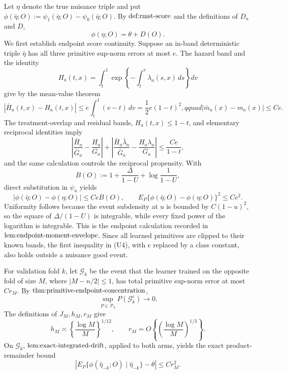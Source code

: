 Let \(\eta\) denote the true nuisance triple and put \(\phi(\bar\eta;O):=\psi_1(\bar\eta;O)-\psi_0(\bar\eta;O)\).  By \(\textnormal{def:rmst-score}\) and the definitions of \(D_a\) and \(D\),
\[
 \phi(\eta;O)=\theta+D(O).                                             \tag{U1}
\]
We first establish endpoint score continuity.  Suppose an in-band deterministic triple \(\bar\eta\) has all three primitive sup-norm errors at most \(e\).  The hazard band and the identity
\[
 H_a(t,x)=\int_t^1\exp\!\left\{-\int_t^v\lambda_a(s,x)\,ds\right\}dv
\]
give by the mean-value theorem
\[
 |\bar H_a(t,x)-H_a(t,x)|\le e\int_t^1(v-t)\,dv
 =\frac12e(1-t)^2,qquad |\bar m_a(x)-m_a(x)|\le Ce.                   \tag{U2}
\]
The treatment-overlap and residual bands, \(H_a(t,x)\le1-t\), and elementary reciprocal identities imply
\[
 \left|\frac{\bar H_a}{\bar G_a}-\frac{H_a}{G_a}\right|
 +\left|\frac{\bar H_a\bar\lambda_a}{\bar G_a}
       -\frac{H_a\lambda_a}{G_a}\right|
 \le\frac{Ce}{1-t},                                                    \tag{U3}
\]
and the same calculation controls the reciprocal propensity.  With
\[
 B(O):=1+\frac{\Delta}{1-U}+\log\frac1{1-U},
\]
direct substitution in \(\psi_a\) yields
\[
 |\phi(\bar\eta;O)-\phi(\eta;O)|\le CeB(O),
 \qquad E_P\{\phi(\bar\eta;O)-\phi(\eta;O)\}^2\le Ce^2.              \tag{U4}
\]
Uniformity follows because the event subdensity at \(u\) is bounded by \(C(1-u)^2\), so the square of \(\Delta/(1-U)\) is integrable, while every fixed power of the logarithm is integrable.  This is the endpoint calculation recorded in \(\textnormal{lem:endpoint-moment-envelope}\).  Since all learned primitives are clipped to their known bands, the first inequality in (U4), with \(e\) replaced by a class constant, also holds outside a nuisance good event.

For validation fold \(k\), let \(\mathcal G_k\) be the event that the learner trained on the opposite fold of size \(M\), where \(|M-n/2|\le1\), has total primitive sup-norm error at most \(Cr_M\).  By \(\textnormal{thm:primitive-endpoint-concentration}\),
\[
 \sup_{P\in\mathcal P_4}P(\mathcal G_k^c)\longrightarrow0.            \tag{U5}
\]
The definitions of \(J_M,h_M,r_M\) give
\[
 h_M\asymp\left\{\frac{\log M}{M}\right\}^{1/12},
 \qquad r_M=O\!\left\{\left(\frac{\log M}{M}\right)^{1/3}\right\}. \tag{U6}
\]
On \(\mathcal G_k\), \(\textnormal{lem:exact-integrated-drift}\), applied to both arms, yields the exact product-remainder bound
\[
 \left|E_P\{\phi(\widehat\eta_{-k};O)\mid\widehat\eta_{-k}\}-\theta\right|
 \le Cr_M^2.                                                           \tag{U7}
\]

